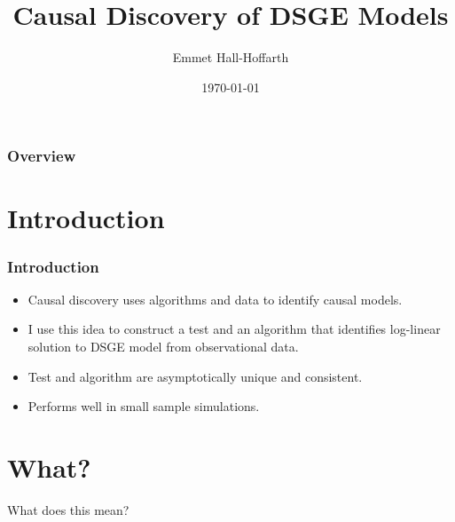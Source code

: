 \documentclass{beamer}
\title[Causal Discovery DSGE]{Causal Discovery of DSGE Models} %
\author{Emmet Hall-Hoffarth} %
\institute[Oxford] %
{
University of Oxford \\ %
\medskip
\textit{emmet.hall-hoffarth@economics.ox.ac.uk} %
}
\date{\today} %
\begin{document}
\begin{frame}
    \titlepage %
\end{frame}

\begin{frame}
    \frametitle{Overview} %
    \tableofcontents %
\end{frame}

\section{Introduction}

\begin{frame}
    \frametitle{Introduction}
    \begin{itemize}
        \item Causal discovery uses algorithms and data to identify causal models.
        \item I use this idea to construct a test and an algorithm that identifies log-linear solution to DSGE model from observational data.
        \item Test and algorithm are asymptotically unique and consistent.
        \item Performs well in small sample simulations.
    \end{itemize}
\end{frame}

\section{What?}

\begin{frame}
    \centering
    \huge
    What does this mean?
\end{frame}
\end{document}
